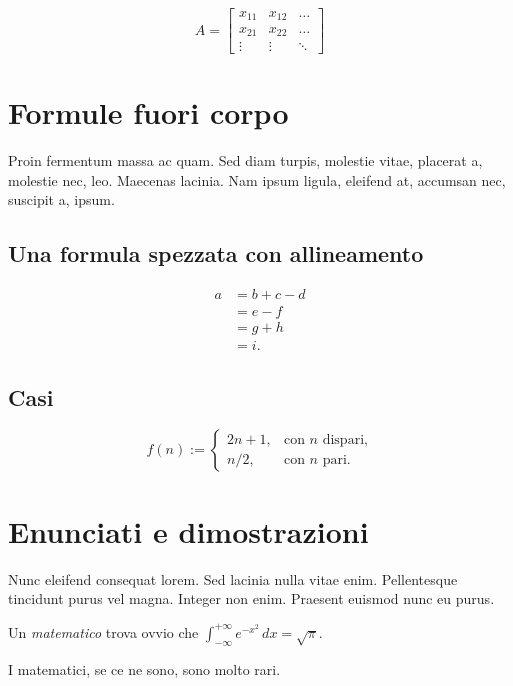 \lipsum[2]
\begin{equation}
A=
\begin{bmatrix}
x_{11} & x_{12} & \dots \\
x_{21} & x_{22} & \dots \\
\vdots & \vdots & \ddots
\end{bmatrix}
\end{equation}

\section{Formule fuori corpo}

Proin fermentum massa ac quam. Sed diam turpis, molestie vitae, placerat a, molestie nec, leo. Maecenas lacinia. Nam ipsum ligula, eleifend at, accumsan nec, suscipit a, ipsum. 

\subsection{Una formula spezzata con allineamento}

\lipsum[2]
\begin{equation} 
\begin{split} 
a &= b+c-d \\ 
  &= e-f \\ 
  &= g+h \\ 
  &= i. 
\end{split} 
\end{equation}

\subsection{Casi}

\lipsum[3]
\begin{equation}
f(n):=
\begin{cases} 
2n+1, & \text{con $n$ dispari,} \\ 
n/2,  & \text{con $n$ pari.} 
\end{cases} 
\end{equation}

\section{Enunciati e dimostrazioni}

Nunc eleifend consequat lorem. Sed lacinia nulla vitae enim. Pellentesque tincidunt purus vel magna. Integer non enim. Praesent euismod nunc eu purus.
\begin{definizione}[di Gauss] 
Un \emph{matematico} trova ovvio che
$\int_{-\infty}^{+\infty}
e^{-x^2}\,dx=\sqrt{\pi}$. 
\end{definizione} 
\begin{teorema} 
I matematici, se ce ne sono, sono molto rari.
\end{teorema} 

